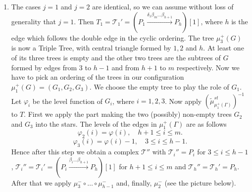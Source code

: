 \documentclass[12pt]{amsart}
\theoremstyle{plain}
\theoremstyle{remark}
\theoremstyle{definition}
\begin{document}
\begin{enumerate}
\begin{enumerate}
$$\mathcal{T}_{i} = \mathcal{T}_{i-m+l-2}' =  $$

$$(P_h \xrightarrow{\begin{pmatrix} soc \\ -\beta_h\dots\beta_4\alpha_1 \\ -\beta_h \dots \beta_4 \alpha_2 \end{pmatrix}} P_h \oplus P_1 \oplus P_{2} \xrightarrow{\begin{pmatrix} \beta_h \dots \beta_{i-m+l-1} & \delta_1 \beta_m \dots \beta_{i-m+l-1} & \delta_2\beta_m \dots \beta_{i-m+l-1} \end{pmatrix}} P_{i-m+l-2})[1], $$ $$ m-l+6 \leq i \leq m-l+h+1. $$

$$\mathcal{T}_{i} = \mathcal{T}_{i-m+l-1}' = (P_{i-m+l-1} \xrightarrow{\begin{pmatrix} \beta_{i-m+l-1} \dots \beta_4 \alpha_1 \\ \beta_{i-m+l-1} \dots \beta_4 \alpha_2 \end{pmatrix}} P_1 \oplus P_{2})[1], \quad m-l+h+2 \leq i \leq m.$$ 

We have 
$\mathcal{H}(\Lambda) = t_{m-l+5}^{-1} \circ \dots \circ t_{m-l+h+1}^{-1} \circ (t_m \circ \dots \circ t_4 \circ t_3 \circ t_1 \circ t_2 \circ t_3)^{l-3}[-2(l-3)](\Lambda)$ (see Section \ref{sec:app} for details).
\item\label{difcase2} The cases $j=1$ and $j=2$ are identical, so we can assume without loss of generality that $j = 1$. Then $T_1 = \mathcal{T}_1' = (P_1 \xrightarrow{\delta_1\beta_m\dots\beta_{h+1}} P_h)[1]$, where $h$ is the edge which follows the double edge in the cyclic ordering. The tree $\mu_3^+(G)$ is now a Triple Tree, with central triangle formed by $1, 2$ and $h$. At least one of its three trees is empty and the other two trees are the subtrees of $G$ formed by edges from $3$ to $h-1$ and from $h+1$ to $m$ respectively. Now we have to pick an ordering of the trees in our configuration $\mu_1^+(G) = (G_1, G_2, G_3)$. We choose the empty tree to play the role of $G_1$. Let $\varphi_i$ be the level function of $G_i$, where $i=1,2,3$. Now apply $(\widetilde{\mu}^{st}_{\mu^+_1(\Gamma)})^{-1}$ to $T$. First we apply the part making the two (possibly) non-empty trees $G_2$ and $G_3$ into the stars. The levels of the edges in $\mu_1^+(\Gamma)$ are as follows 
    $$\varphi_2(i) = \varphi(i), \quad h+1 \leq i \leq m.$$
    $$\varphi_3(i) = \varphi(i) - 1, \quad 3 \leq i \leq h-1. $$
    Hence after this step we obtain a complex $\mathcal{T}''$ with $\mathcal{T}_i'' = P_i$ for $3\leq i \leq h-1$, ${\mathcal{T}_i'' = \mathcal{T}_i' = (P_i \xrightarrow{\beta_i \dots \beta_{h+1}} P_h)[1]}$ for $h+1 \leq i \leq m$ and $\mathcal{T}_h'' = \mathcal{T}_h' = P_h$. After that we apply $\mu_{3}^-\circ \dots \circ \mu_{h-1}^-$ and, finally, $\mu_{2}^-$ (see the picture below). 
    

\end{enumerate}
\end{enumerate}
\end{document}
